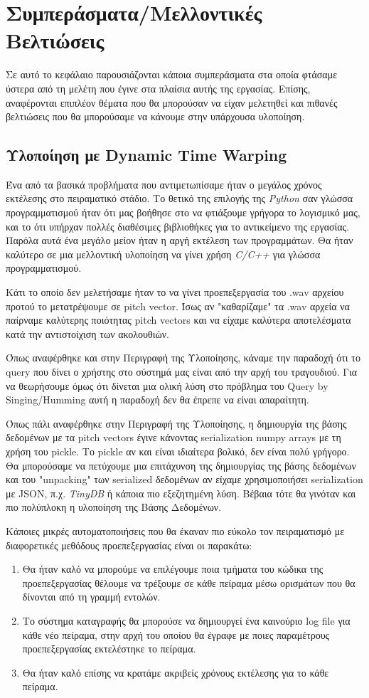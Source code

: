 \section{Συμπεράσματα/Μελλοντικές Βελτιώσεις}
Σε αυτό το κεφάλαιο παρουσιάζονται κάποια συμπεράσματα στα οποία φτάσαμε ύστερα από τη μελέτη που έγινε στα πλαίσια αυτής της εργασίας. Επίσης, αναφέρονται επιπλέον θέματα που θα μπορούσαν να είχαν μελετηθεί
και πιθανές βελτιώσεις που θα μπορούσαμε να κάνουμε στην υπάρχουσα υλοποίηση.

\subsection{Υλοποίηση με Dynamic Time Warping}
Ένα από τα βασικά προβλήματα που αντιμετωπίσαμε ήταν ο μεγάλος χρόνος εκτέλεσης στο πειραματικό στάδιο. Το θετικό της επιλογής της \textit{Python} \cite{python} σαν γλώσσα προγραμματισμού ήταν ότι μας βοήθησε στο να φτιάξουμε γρήγορα το λογισμικό μας, και το ότι υπήρχαν πολλές διαθέσιμες βιβλιοθήκες για το αντικείμενο της εργασίας. Παρόλα αυτά ένα μεγάλο μείον ήταν η αργή εκτέλεση των προγραμμάτων. Θα ήταν καλύτερο σε μια μελλοντική υλοποίηση να γίνει χρήση \textit{C/C++} για γλώσσα προγραμματισμού.

Κάτι το οποίο δεν μελετήσαμε ήταν το να γίνει προεπεξεργασία του .wav αρχείου προτού το μετατρέψουμε σε pitch vector. Ίσως αν "καθαρίζαμε" τα .wav αρχεία να παίρναμε καλύτερης ποιότητας pitch vectors και να είχαμε καλύτερα αποτελέσματα κατά την αντιστοίχιση των ακολουθιών.

Όπως αναφέρθηκε και στην Περιγραφή της Υλοποίησης, κάναμε την παραδοχή ότι το query που δίνει ο χρήστης στο σύστημά μας είναι από την αρχή του τραγουδιού. Για να θεωρήσουμε όμως ότι δίνεται μια ολική λύση στο πρόβλημα του Query by Singing/Humming αυτή η παραδοχή δεν θα έπρεπε να είναι απαραίτητη.

Όπως πάλι αναφέρθηκε στην Περιγραφή της Υλοποίησης, η δημιουργία της βάσης δεδομένων με τα pitch vectors έγινε κάνοντας serialization numpy arrays με τη χρήση του pickle. Το pickle αν και είναι ιδιαίτερα βολικό, δεν είναι πολύ γρήγορο. Θα μπορούσαμε να πετύχουμε μια επιτάχυνση της δημιουργίας της βάσης δεδομένων και του "unpacking" των serialized δεδομένων αν είχαμε χρησιμοποιήσει serialization με JSON, π.χ. \textit{TinyDB} \cite{tinydb} ή κάποια πιο εξεζητημένη λύση. Βέβαια τότε θα γινόταν και πιο πολύπλοκη η υλοποίηση της Βάσης Δεδομένων.

Κάποιες μικρές αυτοματοποιήσεις που θα έκαναν πιο εύκολο τον πειραματισμό με διαφορετικές μεθόδους προεπεξεργασίας είναι οι παρακάτω:
\begin{enumerate}
	\item Θα ήταν καλό να μπορούμε να επιλέγουμε ποια τμήματα του κώδικα της προεπεξεργασίας θέλουμε να τρέξουμε σε κάθε πείραμα μέσω ορισμάτων που θα δίνονται από τη γραμμή εντολών.
	\item Το σύστημα καταγραφής θα μπορούσε να δημιουργεί ένα καινούριο log file για κάθε νέο πείραμα, στην αρχή του οποίου θα έγραφε με ποιες παραμέτρους προεπεξεργασίας εκτελέστηκε το πείραμα.
	\item Θα ήταν καλό επίσης να κρατάμε ακριβείς χρόνους εκτέλεσης για το κάθε πείραμα.
\end{enumerate}

